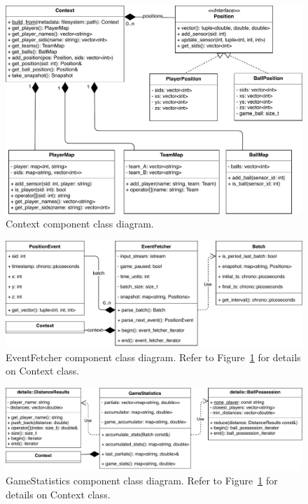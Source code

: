 \documentclass[a4paper, 11pt]{article}
\begin{document}
\begin{figure}[h]
    \centering
    \includegraphics[height=.43\textheight, width=1\textwidth, keepaspectratio]{UML/context_class_diagram.pdf}
    \caption{Context component class diagram.}
    \label{fig:context_class}
\end{figure}
\begin{figure}[h]
    \centering
    \includegraphics[height=.6\textheight, width=1\textwidth, keepaspectratio]{UML/event_fetcher_class_diagram.pdf}
    \caption{EventFetcher component class diagram. Refer to Figure~\ref{fig:context_class} for details on Context class.}
    \label{fig:event_fetcher_class}
\end{figure}
\begin{figure}[h]
    \centering
    \includegraphics[height=.5\textheight, width=1\textwidth, keepaspectratio]{UML/game_statistics_class_diagram.pdf}
    \caption{GameStatistics component class diagram. Refer to Figure~\ref{fig:context_class} for details on Context class.}
    \label{fig:game_statistics_class}
\end{figure}
\end{document}
